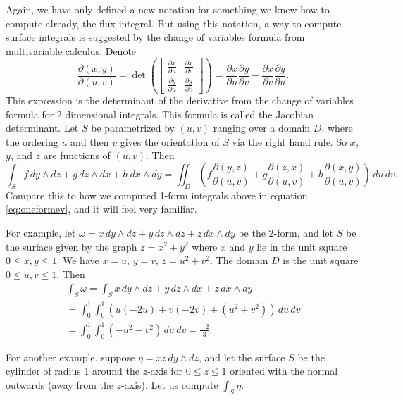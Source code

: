 \documentclass[12pt]{article}
\begin{document}
Again, we have only defined a new notation for something we knew how to compute already,
the flux integral.  But using this notation,
a way to compute surface integrals is suggested by the change of
variables formula from multivariable calculus.
Denote
\[
\frac{\partial (x,y)}{\partial (u,v)}
=
\det \left(
\begin{bmatrix}
\frac{\partial x}{\partial u}
&
\frac{\partial x}{\partial v}
\\[3pt]
\frac{\partial y}{\partial u} 
&
\frac{\partial y}{\partial v}
\end{bmatrix}
\right)
=
\frac{\partial x}{\partial u}
\frac{\partial y}{\partial v}
-
\frac{\partial x}{\partial v}
\frac{\partial y}{\partial u} .
\]
This expression is the determinant of the derivative from the
change of variables formula for 2 dimensional integrals.
This formula is called the Jacobian determinant.
Let $S$ be parametrized by $(u,v)$ ranging over a domain $D$,
where the ordering $u$ and then $v$
gives the orientation of $S$ via the right hand rule.
So $x$, $y$, and $z$ are functions of $(u,v)$.
Then
\begin{equation*}
\int_S
f\, dy \wedge dz + 
g\, dz \wedge dx +
h\, dx \wedge dy
=
\iint_D
\left(
f 
\frac{\partial (y,z)}{\partial (u,v)}
+
g
\frac{\partial (z,x)}{\partial (u,v)}
+
h
\frac{\partial (x,y)}{\partial (u,v)}
\right)
\,
du\, dv .
\end{equation*}
Compare this to how we computed 1-form integrals above in
equation \eqref{eq:oneformev}, and it will feel very familiar.

For example, let $\omega = x \, dy \wedge dz + y \, dz \wedge dz
+ z \, dx \wedge dy$ be the
$2$-form, and let
$S$ be the surface given by the graph $z=x^2+y^2$ where $x$ and $y$ lie in
the unit square $0 \leq x,y \leq 1$.  We have $x=u$, $y=v$, $z=u^2+v^2$.
The domain $D$ is the unit square $0 \leq u,v \leq 1$.  Then
\begin{multline*}
\int_S \omega =
\int_S
x\, dy \wedge dz + 
y\, dz \wedge dx +
z\, dx \wedge dy
\\
=
\int_0^1 \int_0^1
\left(
u 
(-2u)
+
v
(-2v)
+
(u^2+v^2)
\right)
\,
du\, dv 
\\
=
\int_0^1 \int_0^1
(-u^2-v^2)
\,
du\, dv 
=
\frac{-2}{3} .
\end{multline*}

For another example, suppose $\eta = xz \, dy \wedge dz$,
and let the surface $S$ be the cylinder of radius 1 around the $z$-axis
for $0 \leq z \leq 1$ oriented with the normal outwards (away from the
$z$-axis).   Let us compute $\int_S \eta$.
\end{document}
